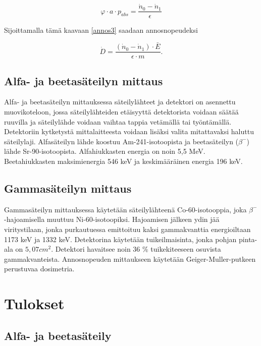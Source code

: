 \documentclass[a4paper,11pt]{article}
\begin{document}
\begin{equation}
  \varphi \cdot a \cdot p_{abs} = \frac{\dot{n}_0-\dot{n}_1}{\epsilon}
\end{equation}

Sijoittamalla tämä kaavaan \ref{annos3} saadaan annosnopeudeksi

\begin{equation}
  \dot{D} = \frac{(\dot{n}_0-\dot{n}_1) \cdot \bar{E}}{\epsilon \cdot m} .
\end{equation}

\subsection{Alfa- ja beetasäteilyn mittaus}
\label{laitteisto:alfabeeta}

Alfa- ja beetasäteilyn mittauksessa säteilylähteet ja detektori on asennettu muovikoteloon, jossa säteilylähteiden etäisyyttä detektorista voidaan säätää ruuvilla ja säteilylähde voidaan vaihtaa tappia vetämällä tai työntämällä. Detektoriin kytketystä mittalaitteesta voidaan lisäksi valita mitattavaksi haluttu säteilylaji. Alfasäteilyn lähde koostuu Am-241-isotoopista ja beetasäteilyn ($\beta^-$) lähde Sr-90-isotoopista. Alfahiukkasten energia on noin 5,5 MeV. Beetahiukkasten maksimienergia 546 keV ja keskimääräinen energia 196 keV.


\subsection{Gammasäteilyn mittaus}
\label{laitteisto:gamma}

Gammasäteilyn mittauksessa käytetään säteilylähteenä Co-60-isotooppia, joka $\beta^-$-hajoamisella muuttuu Ni-60-isotoopiksi. Hajoamisen jälkeen ydin jää viritystilaan, jonka purkautuessa emittoituu kaksi gammakvanttia energioiltaan 1173 keV ja 1332 keV. Detektorina käytetään tuikeilmaisinta, jonka pohjan pinta-ala on $5,07 cm^2$. Detektori havaitsee noin 36 \% tuikekiteeseen osuvista gammakvanteista. Annosnopeuden mittaukseen käytetään Geiger-Muller-putkeen perustuvaa dosimetria. 



\section{Tulokset}

\subsection{Alfa- ja beetasäteily}
\label{tulokset:alfabeeta}
\end{document}
